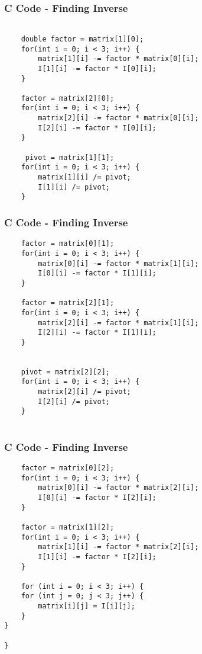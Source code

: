 \documentclass{beamer}
\begin{document}
\begin{frame}[fragile]
    \frametitle{C Code - Finding Inverse}

    \begin{lstlisting}
    
    double factor = matrix[1][0];
    for(int i = 0; i < 3; i++) {
        matrix[1][i] -= factor * matrix[0][i];
        I[1][i] -= factor * I[0][i];
    }
   
    factor = matrix[2][0];
    for(int i = 0; i < 3; i++) {
        matrix[2][i] -= factor * matrix[0][i];
        I[2][i] -= factor * I[0][i];
    }

     pivot = matrix[1][1];
    for(int i = 0; i < 3; i++) {
        matrix[1][i] /= pivot;
        I[1][i] /= pivot;
    }

    \end{lstlisting}

\end{frame}


\begin{frame}[fragile]
    \frametitle{C Code - Finding Inverse}

    \begin{lstlisting}
    factor = matrix[0][1];
    for(int i = 0; i < 3; i++) {
        matrix[0][i] -= factor * matrix[1][i];
        I[0][i] -= factor * I[1][i];
    }

    factor = matrix[2][1];
    for(int i = 0; i < 3; i++) {
        matrix[2][i] -= factor * matrix[1][i];
        I[2][i] -= factor * I[1][i];
    }
   

    pivot = matrix[2][2];
    for(int i = 0; i < 3; i++) {
        matrix[2][i] /= pivot;
        I[2][i] /= pivot;
    }


    \end{lstlisting}

\end{frame}

\begin{frame}[fragile]
    \frametitle{C Code - Finding Inverse}

    \begin{lstlisting}
    factor = matrix[0][2];
    for(int i = 0; i < 3; i++) {
        matrix[0][i] -= factor * matrix[2][i];
        I[0][i] -= factor * I[2][i];
    }

    factor = matrix[1][2];
    for(int i = 0; i < 3; i++) {
        matrix[1][i] -= factor * matrix[2][i];
        I[1][i] -= factor * I[2][i];
    }

    for (int i = 0; i < 3; i++) {
    for (int j = 0; j < 3; j++) {
        matrix[i][j] = I[i][j];
    }
}

}
    \end{lstlisting}
    
\end{frame}
\end{document}

